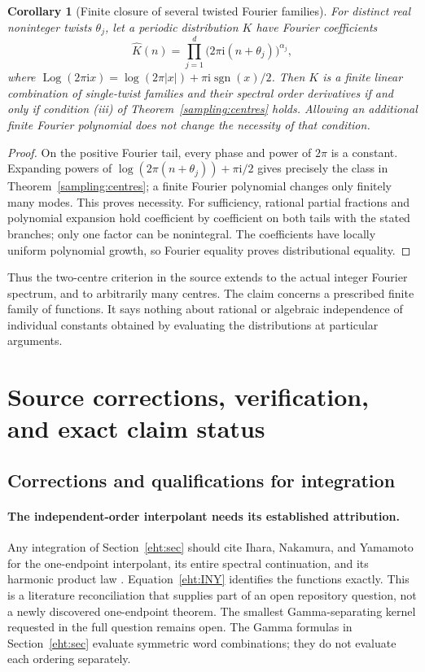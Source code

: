 \documentclass[11pt]{article}
\numberwithin{equation}{section}
\theoremstyle{plain}
\newtheorem{corollary}[theorem]{Corollary}
\theoremstyle{definition}
\theoremstyle{remark}
\DeclareMathOperator{\Log}{Log}
\DeclareMathOperator{\sgn}{sgn}
\newcommand{\ii}{\mathrm i}
\begin{document}
\begin{corollary}[Finite closure of several twisted Fourier families]
\label{sampling:twisted}
For distinct real noninteger twists $\theta_j$, let a periodic
distribution $K$ have Fourier coefficients
\[
 \widehat K(n)=\prod_{j=1}^d\bigl(2\pi\ii(n+\theta_j)\bigr)^{\alpha_j},
\]
where $\Log(2\pi\ii x)=\log(2\pi|x|)+\pi\ii\sgn(x)/2$.
Then $K$ is a finite linear combination of single-twist families
and their spectral order derivatives if and only if condition (iii)
of Theorem~\ref{sampling:centres} holds. Allowing an additional finite
Fourier polynomial does not change the necessity of that condition.
\end{corollary}
\begin{proof}
On the positive Fourier tail, every phase and power of $2\pi$ is
a constant. Expanding powers of
$\log(2\pi(n+\theta_j))+\pi\ii/2$ gives precisely the class in
Theorem~\ref{sampling:centres}; a finite Fourier polynomial changes
only finitely many modes. This proves necessity. For sufficiency,
rational partial fractions and polynomial expansion hold coefficient
by coefficient on both tails with the stated branches; only one
factor can be nonintegral. The coefficients have locally uniform
polynomial growth, so Fourier equality proves distributional equality.
\end{proof}

Thus the two-centre criterion in the source extends to the actual
integer Fourier spectrum, and to arbitrarily many centres. The claim
concerns a prescribed finite family of functions. It says nothing
about rational or algebraic independence of individual constants
obtained by evaluating the distributions at particular arguments.



\section{Source corrections, verification, and exact claim status}
\label{audit:section}

\subsection{Corrections and qualifications for integration}

\paragraph{The independent-order interpolant needs its established attribution.}
Any integration of Section~\ref{eht:sec} should cite Ihara, Nakamura,
and Yamamoto for the one-endpoint interpolant, its entire spectral
continuation, and its harmonic product law \cite{eht:INY}.
Equation~\eqref{eht:INY} identifies the functions exactly. This is a
literature reconciliation that supplies part of an open repository
question, not a newly discovered one-endpoint theorem. The smallest
Gamma-separating kernel requested in the full question remains open.
The Gamma formulas in Section~\ref{eht:sec} evaluate symmetric word
combinations; they do not evaluate each ordering separately.
\end{document}

